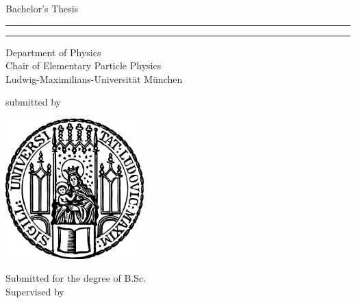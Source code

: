 \newpage
\begin{titlepage}
  \begin{center}
    \LARGE Bachelor's Thesis

    \vspace{0.5cm}
    \rule{\textwidth}{1.5pt}
    \LARGE\textbf{\titleEn}
    \rule{\textwidth}{1.5pt}

    \vspace{0.5cm}
    \large
    Department of Physics \\
    Chair of Elementary Particle Physics \\
    Ludwig-Maximilians-Universität München

    \vfill
    submitted by \\
    \Large \textbf{\name}

    \vfill
    \large \dateEn

    \vfill
    \includegraphics[width=0.4\textwidth]{static/sigillum.png}

    \vfill
    \normalsize Submitted for the degree of B.Sc. \\
    Supervised by \supervisor
  \end{center}
\end{titlepage}
\newpage

\null\thispagestyle{empty}